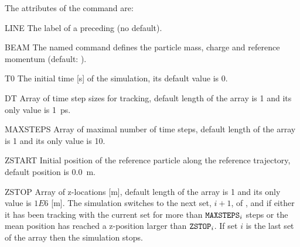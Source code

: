 The attributes of the command are:
\begin{kdescription}
\item[LINE]
  The label of a preceding  
   (no default).
\item[BEAM]
  The named  command defines the particle mass, charge
  and reference momentum (default: ).
\item[T0]
 The initial time [\si{\second}] of the simulation, its default value is 0.
\item[DT]
  Array of  time step sizes for tracking, default length of the array is 1 and its only value is \SI{1}{\pico\second}.
\item[MAXSTEPS]
  Array of maximal number of time steps, default length of the array is 1 and its only value is 10.
\item[ZSTART]
  Initial position of the reference particle along the reference trajectory, default position is \SI{0.0}{\meter}.
\item[ZSTOP]
  Array of z-locations [m], default length of the array is 1 and its only value is $1E6$ [m]. The simulation switches to the next set, $i+1$, of ,  and  if either it has been tracking with the current set for more than $\text{\keyword{MAXSTEPS}}_i$ steps or the mean position has reached a z-position larger than $\text{\keyword{ZSTOP}}_i$. If set $i$ is the last set of the array then the simulation stops.


\end{kdescription}
